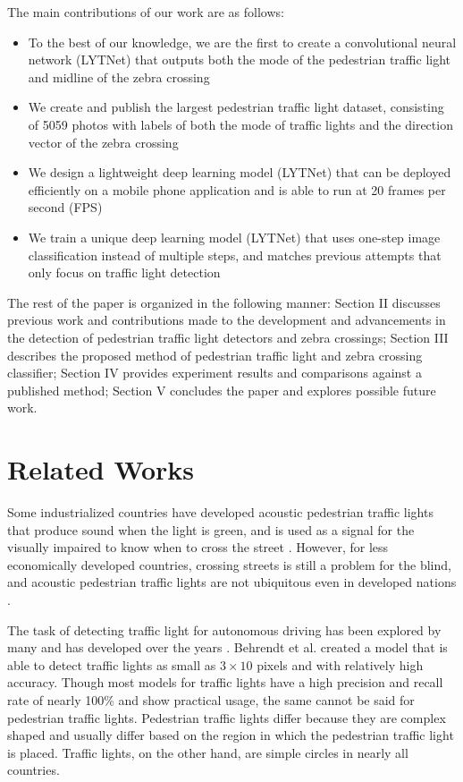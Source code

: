 \documentclass[runningheads]{llncs}
\begin{document}
The main contributions of our work are as follows:
\begin{itemize}
    \item To the best of our knowledge, we are the first to create a convolutional neural network (LYTNet) that outputs both the mode of the pedestrian traffic light and midline of the zebra crossing 
    \item We create and publish the largest pedestrian traffic light dataset, consisting of 5059 photos with labels of both the mode of traffic lights and the direction vector of the zebra crossing \cite{2}
    \item We design a lightweight deep learning model (LYTNet) that can be deployed efficiently on a mobile phone application and is able to run at 20 frames per second (FPS)
    \item We train a unique deep learning model (LYTNet) that uses one-step image classification instead of multiple steps, and matches previous attempts that only focus on traffic light detection

\end{itemize}
The rest of the paper is organized in the following manner: Section II discusses previous work and contributions made to the development and advancements in the detection of pedestrian traffic light detectors and zebra crossings; Section III describes the proposed method of pedestrian traffic light and zebra crossing classifier; Section IV provides experiment results and comparisons against a published method; Section V concludes the paper and explores possible future work.

\section{Related Works}
Some industrialized countries have developed acoustic pedestrian traffic lights that produce sound when the light is green, and is used as a signal for the visually impaired to know when to cross the street \cite{3,4,5}. However, for less economically developed countries, crossing streets is still a problem for the blind, and acoustic pedestrian traffic lights are not ubiquitous even in developed nations \cite{3}. 

The task of detecting traffic light for autonomous driving has been explored by many and has developed over the years \cite{6,7,8,9}. Behrendt et al. \cite{10} created a model that is able to detect traffic lights as small as $3 \times 10$ pixels and with relatively high accuracy. Though most models for traffic lights have a high precision and recall rate of nearly 100\% and show practical usage, the same cannot be said for pedestrian traffic lights. Pedestrian traffic lights differ because they are complex shaped and usually differ based on the region in which the pedestrian traffic light is placed. Traffic lights, on the other hand, are simple circles in nearly all countries.
\end{document}

